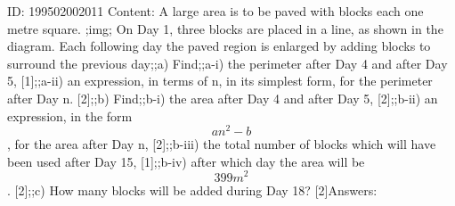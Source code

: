 \documentclass{article}
\begin{document}
ID: 199502002011
Content:
A large area is to be paved with blocks each one metre square. ;img; On Day 1, three blocks are placed in a line, as shown in the diagram. Each following day the paved region is enlarged by adding blocks to surround the previous day;;a) Find;;a-i) the perimeter after Day 4 and after Day 5, [1];;a-ii) an expression, in terms of n, in its simplest form, for the perimeter after Day n. [2];;b) Find;;b-i) the area after Day 4 and after Day 5, [2];;b-ii) an expression, in the form $$an^2 - b$$, for the area after Day n, [2];;b-iii) the total number of blocks which will have been used after Day 15, [1];;b-iv) after which day the area will be $$399 m^2$$. [2];;c) How many blocks will be added during Day 18? [2]Answers:
\end{document}
